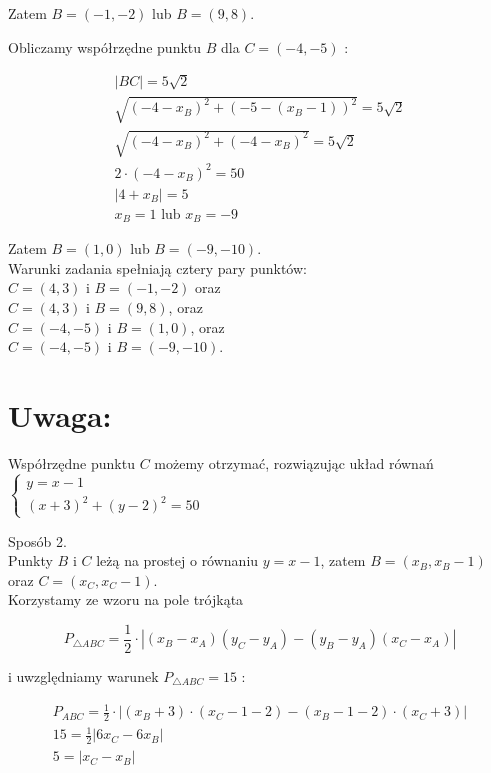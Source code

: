 \documentclass[10pt]{article}
\begin{document}
Zatem $B=(-1,-2)$ lub $B=(9,8)$.

Obliczamy współrzędne punktu $B$ dla $C=(-4,-5)$ :

$$
\begin{gathered}
|B C|=5 \sqrt{2} \\
\sqrt{\left(-4-x_{B}\right)^{2}+\left(-5-\left(x_{B}-1\right)\right)^{2}}=5 \sqrt{2} \\
\sqrt{\left(-4-x_{B}\right)^{2}+\left(-4-x_{B}\right)^{2}}=5 \sqrt{2} \\
2 \cdot\left(-4-x_{B}\right)^{2}=50 \\
\left|4+x_{B}\right|=5 \\
x_{B}=1 \text { lub } x_{B}=-9
\end{gathered}
$$

Zatem $B=(1,0)$ lub $B=(-9,-10)$.\\
Warunki zadania spełniają cztery pary punktów:\\
$C=(4,3)$ i $B=(-1,-2)$ oraz\\
$C=(4,3)$ i $B=(9,8)$, oraz\\
$C=(-4,-5)$ i $B=(1,0)$, oraz\\
$C=(-4,-5)$ i $B=(-9,-10)$.

\section*{Uwaga:}
Współrzędne punktu $C$ możemy otrzymać, rozwiązując układ równań\\
$\left\{\begin{array}{l}y=x-1 \\ (x+3)^{2}+(y-2)^{2}=50\end{array}\right.$

Sposób 2.\\
Punkty $B$ i $C$ leżą na prostej o równaniu $y=x-1$, zatem $B=\left(x_{B}, x_{B}-1\right)$ oraz $C=\left(x_{C}, x_{C}-1\right)$.\\
Korzystamy ze wzoru na pole trójkąta

$$
P_{\triangle A B C}=\frac{1}{2} \cdot\left|\left(x_{B}-x_{A}\right)\left(y_{C}-y_{A}\right)-\left(y_{B}-y_{A}\right)\left(x_{C}-x_{A}\right)\right|
$$

i uwzględniamy warunek $P_{\triangle A B C}=15$ :

$$
\begin{gathered}
P_{A B C}=\frac{1}{2} \cdot\left|\left(x_{B}+3\right) \cdot\left(x_{C}-1-2\right)-\left(x_{B}-1-2\right) \cdot\left(x_{C}+3\right)\right| \\
15=\frac{1}{2}\left|6 x_{C}-6 x_{B}\right| \\
5=\left|x_{C}-x_{B}\right|
\end{gathered}
$$
\end{document}
